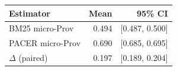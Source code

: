 \begin{tabular}{lrr}
\hline
Estimator & Mean & 95\% CI \\
\hline
BM25 micro-Prov & 0.494 & [0.487, 0.500] \\
PACER micro-Prov & 0.690 & [0.685, 0.695] \\
$\Delta$ (paired) & 0.197 & [0.189, 0.204] \\
\hline
\end{tabular}

